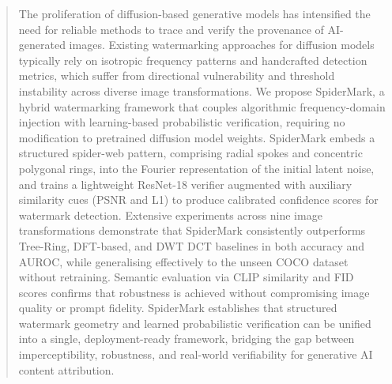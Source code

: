\begin{abstract}
\color{red} 
The proliferation of diffusion-based generative models has intensified the need for reliable methods to trace and verify the provenance of AI-generated images. Existing watermarking approaches for diffusion models typically rely on isotropic frequency patterns and handcrafted detection metrics, which suffer from directional vulnerability and threshold instability across diverse image transformations. We propose SpiderMark, a hybrid watermarking framework that couples algorithmic frequency-domain injection with learning-based probabilistic verification, requiring no modification to pretrained diffusion model weights. SpiderMark embeds a structured spider-web pattern, comprising radial spokes and concentric polygonal rings, into the Fourier representation of the initial latent noise, and trains a lightweight ResNet-18 verifier augmented with auxiliary similarity cues (PSNR and L1) to produce calibrated confidence scores for watermark detection. Extensive experiments across nine image transformations demonstrate that SpiderMark consistently outperforms Tree-Ring, DFT-based, and DWT DCT baselines in both accuracy and AUROC, while generalising effectively to the unseen COCO dataset without retraining. Semantic evaluation via CLIP similarity and FID scores confirms that robustness is achieved without compromising image quality or prompt fidelity. SpiderMark establishes that structured watermark geometry and learned probabilistic verification can be unified into a single, deployment-ready framework, bridging the gap between imperceptibility, robustness, and real-world verifiability for generative AI content attribution.
\end{abstract}